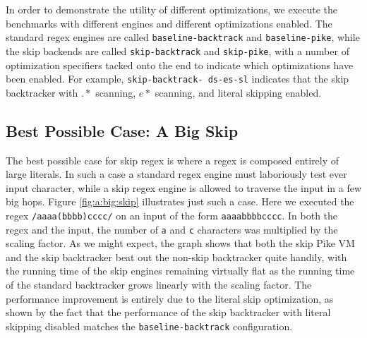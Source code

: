 In order to demonstrate the utility of different optimizations,
we execute the benchmarks with different engines and different
optimizations enabled. The standard regex engines are called
\texttt{baseline\allowbreak -\allowbreak backtrack} and
\texttt{baseline\allowbreak -\allowbreak pike}, while the
skip backends are called \texttt{skip\allowbreak -\allowbreak backtrack}
and \texttt{skip\allowbreak -\allowbreak pike},
with a number of optimization specifiers tacked onto the end to
indicate which optimizations have been enabled. For example,
\texttt{skip\allowbreak -\allowbreak backtrack\allowbreak -\allowbreak
        ds\allowbreak -\allowbreak es\allowbreak -\allowbreak sl}
indicates that the skip backtracker with $.*$ scanning, $e*$ scanning,
and literal skipping enabled.


\subsection{Best Possible Case: A Big Skip}

The best possible case for skip regex is where a regex is composed
entirely of large literals. In such a case a standard regex engine
must laboriously test ever input character, while a skip regex
engine is allowed to traverse the input in a few big hops. Figure
\ref{fig:a:big:skip} illustrates just such a case. Here we executed the
regex \verb'/aaaa(bbbb)cccc/' on an input of the form \verb'aaaabbbbcccc'.
In both the regex and the input, the number of \verb'a' and \verb'c'
characters was multiplied by the scaling factor. As we might expect,
the graph shows that both the skip Pike VM and the skip backtracker
beat out the non-skip backtracker quite handily, with the running time
of the skip engines remaining virtually flat as the running
time of the standard backtracker grows linearly with the scaling factor.
The performance improvement is entirely due to the literal skip
optimization, as shown by the fact that the performance of the skip
backtracker with literal skipping disabled matches the
\verb'baseline-backtrack' configuration.

